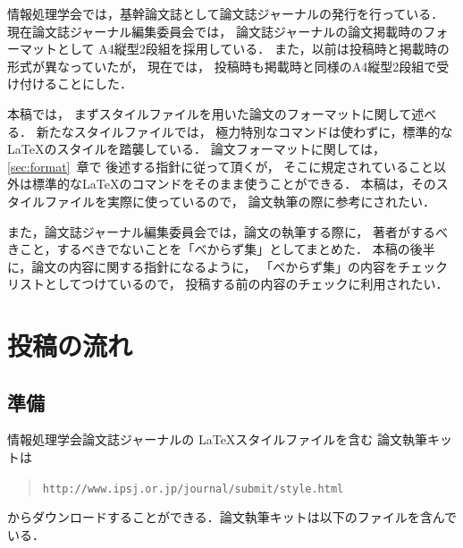 \documentclass[submit]{ipsj-lualatex}
\def\|{\verb|}
\begin{document}
情報処理学会では，基幹論文誌として論文誌ジャーナルの発行を行っている．
現在論文誌ジャーナル編集委員会では，
論文誌ジャーナルの論文掲載時のフォーマットとして
A4縦型2段組を採用している．
また，以前は投稿時と掲載時の形式が異なっていたが，
現在では，
投稿時も掲載時と同様のA4縦型2段組で受け付けることにした．



本稿では，
まずスタイルファイルを用いた論文のフォーマットに関して述べる．
新たなスタイルファイルでは，
極力特別なコマンドは使わずに，標準的な \LaTeX のスタイルを踏襲している．
論文フォーマットに関しては，\ref{sec:format}~章で
後述する指針に従って頂くが，
そこに規定されていること以外は標準的な\LaTeX のコマンドをそのまま使うことができる．
本稿は，そのスタイルファイルを実際に使っているので，
論文執筆の際に参考にされたい．





また，論文誌ジャーナル編集委員会では，論文の執筆する際に，
著者がするべきこと，するべきでないことを「べからず集」としてまとめた．
本稿の後半に，論文の内容に関する指針になるように，
「べからず集」の内容をチェックリストとしてつけているので，
投稿する前の内容のチェックに利用されたい．




%2
\section{投稿の流れ}


%2.1
\subsection{準備}


情報処理学会論文誌ジャーナルの \LaTeX スタイルファイルを含む
論文執筆キットは
\begin{quote}
\small
\|http://www.ipsj.or.jp/journal/submit/style.html|
\end{quote}
からダウンロードすることができる．論文執筆キットは以下のファイルを含んでいる．
\end{document}
